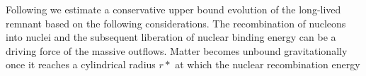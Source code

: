 Following \citet{Radice:2018xqa} we estimate a conservative upper bound 
evolution of the long-lived remnant based on the following considerations.
%
%
%
%
%
The recombination of nucleons into nuclei and the subsequent 
liberation of nuclear binding energy can be a driving force 
of the massive outflows. Matter becomes unbound gravitationally 
once it reaches a cylindrical radius $r*$ at which the nuclear recombination energy 
